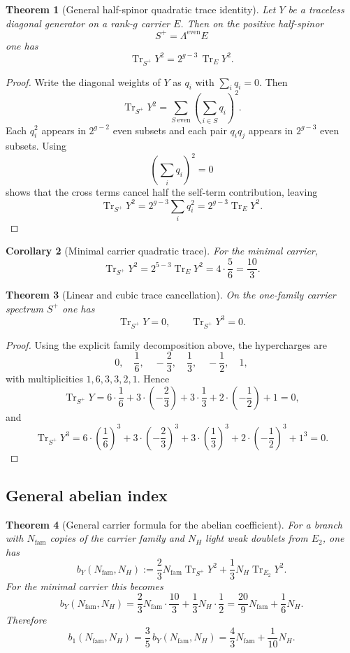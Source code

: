 \documentclass[11pt,a4paper]{article}
\newtheorem{theorem}{Theorem}[section]
\newtheorem{corollary}[theorem]{Corollary}
\theoremstyle{definition}
\theoremstyle{remark}
\newcommand{\bone}{b_1}
\newcommand{\tr}{\operatorname{Tr}}
\begin{document}
\begin{theorem}[General half-spinor quadratic trace identity]
Let $Y$ be a traceless diagonal generator on a rank-$g$ carrier $E$. Then on the positive half-spinor
\[
S^+ = \Lambda^{\mathrm{even}}E
\]
one has
\[
\tr_{S^+}Y^2 = 2^{g-3}\,\tr_EY^2.
\]
\end{theorem}

\begin{proof}
Write the diagonal weights of $Y$ as $q_i$ with $\sum_i q_i=0$. Then
\[
\tr_{S^+}Y^2
=
\sum_{S\ \mathrm{even}}
\left(\sum_{i\in S} q_i\right)^2.
\]
Each $q_i^2$ appears in $2^{g-2}$ even subsets and each pair $q_iq_j$ appears in $2^{g-3}$ even subsets. Using
\[
\left(\sum_i q_i\right)^2=0
\]
shows that the cross terms cancel half the self-term contribution, leaving
\[
\tr_{S^+}Y^2
=
2^{g-3}\sum_i q_i^2
=
2^{g-3}\tr_EY^2.
\]
\end{proof}

\begin{corollary}[Minimal carrier quadratic trace]
For the minimal carrier,
\[
\tr_{S^+}Y^2 = 2^{5-3}\tr_EY^2 = 4\cdot\frac56 = \frac{10}{3}.
\]
\end{corollary}

\begin{theorem}[Linear and cubic trace cancellation]
On the one-family carrier spectrum $S^+$ one has
\[
\tr_{S^+}Y = 0,
\qquad
\tr_{S^+}Y^3 = 0.
\]
\end{theorem}

\begin{proof}
Using the explicit family decomposition above, the hypercharges are
\[
0,\quad \frac16,\quad -\frac23,\quad \frac13,\quad -\frac12,\quad 1,
\]
with multiplicities $1,6,3,3,2,1$. Hence
\[
\tr_{S^+}Y
= 6\cdot\frac16+3\cdot\!\left(-\frac23\right)+3\cdot\frac13+2\cdot\!\left(-\frac12\right)+1=0,
\]
and
\[
\tr_{S^+}Y^3
= 6\cdot\left(\frac16\right)^3
+3\cdot\left(-\frac23\right)^3
+3\cdot\left(\frac13\right)^3
+2\cdot\left(-\frac12\right)^3
+1^3=0.
\]
\end{proof}

\subsection{General abelian index}

\begin{theorem}[General carrier formula for the abelian coefficient]
For a branch with $N_{\mathrm{fam}}$ copies of the carrier family and $N_H$ light weak doublets from $E_2$, one has
\[
b_Y(N_{\mathrm{fam}},N_H)
:= \frac23 N_{\mathrm{fam}}\tr_{S^+}Y^2 + \frac13 N_H\tr_{E_2}Y^2.
\]
For the minimal carrier this becomes
\[
b_Y(N_{\mathrm{fam}},N_H)
= \frac23 N_{\mathrm{fam}}\cdot\frac{10}{3} + \frac13 N_H\cdot\frac12
= \frac{20}{9}N_{\mathrm{fam}}+\frac16 N_H.
\]
Therefore
\[
\bone(N_{\mathrm{fam}},N_H)
= \frac35\,b_Y(N_{\mathrm{fam}},N_H)
= \frac43 N_{\mathrm{fam}}+\frac1{10}N_H.
\]
\end{theorem}
\end{document}
